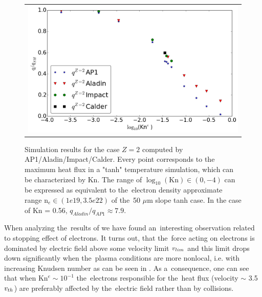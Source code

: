 \begin{figure}[tbh]
  \begin{center}
    \begin{tabular}{c}
      \includegraphics[width=\figscale\textwidth]{Kn_results.png}
    \end{tabular}
  \caption{  
  Simulation results for the case $Z=2$ computed by AP1/Aladin/Impact/Calder.
  Every point corresponds to the maximum heat flux in a "tanh" temperature 
  simulation, which can be characterized by Kn. The range of 
  $\log_{10}(\text{Kn})\in (0, -4)$ can be expressed as equivalent 
  to the~electron density approximate range n$_e \in (1e19, 3.5e22)$ of 
  the~50 $\mu$m slope tanh case. In the case of Kn = 0.56, 
  $q_{Aladin} / q_{AP1}\approx 7.9$.}
  \label{fig:Kn_results}
  \end{center} 
\end{figure}
When analyzing the~results of  we have found 
an~interesting observation related to stopping effect of electrons.
It turns out, that the~force acting on electrons is dominated by electric field
above some velocity limit $v_{lim}$ and this limit drops down significantly
when the~plasma conditions are more nonlocal, i.e. with increasing Knudsen 
number as can be seen in . As a~consequence, one can see
that when Kn$^{e} \sim 10^{-1}$ the~electrons responsible for the~heat flux
(velocity $\sim$ 3.5 $v_{th}$) are preferably affected by the~electric field
rather than by collisions.

